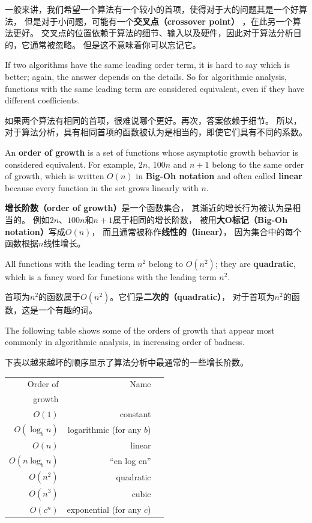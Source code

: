 \documentclass[10pt]{book}
\begin{document}
\begin{CJK}{UTF8}{gbsn}
一般来讲，我们希望一个算法有一个较小的首项，使得对于大的问题其是一个好算法，
但是对于小问题，可能有一个{\bf 交叉点（crossover point）} ，在此另一个算法更好。
交叉点的位置依赖于算法的细节、输入以及硬件，因此对于算法分析目的，它通常被忽略。
但是这不意味着你可以忘记它。

If two algorithms have the same leading order term, it is hard to say
which is better; again, the answer depends on the details.  So for
algorithmic analysis, functions with the same leading term
are considered equivalent, even if they have different coefficients.

如果两个算法有相同的首项，很难说哪个更好。再次，答案依赖于细节。
所以，对于算法分析，具有相同首项的函数被认为是相当的，即使它们具有不同的系数。

An {\bf order of growth} is a set of functions whose asymptotic growth
behavior is considered equivalent.  For example, $2n$, $100n$ and $n+1$ 
belong to the same order of growth, which is written $O(n)$ in
{\bf Big-Oh notation} and often called {\bf linear} because every function
in the set grows linearly with $n$.

{\bf 增长阶数（order of growth）}是一个函数集合，
其渐近的增长行为被认为是相当的。
例如$2n$、$100n$和$n+1$属于相同的增长阶数，
被用{\bf 大O标记（Big-Oh notation）}写成$O(n)$，
而且通常被称作{\bf 线性的（linear）}，
因为集合中的每个函数根据$n$线性增长。

All functions with the leading term $n^2$ belong to $O(n^2)$; they are
{\bf quadratic}, which is a fancy word for functions with the
leading term $n^2$.

首项为$n^2$的函数属于$O(n^2)$。它们是{\bf 二次的（quadratic）}，
对于首项为$n^2$的函数，这是一个有趣的词。

The following table shows some of the orders of growth that
appear most commonly in algorithmic analysis,
in increasing order of badness.

下表以越来越坏的顺序显示了算法分析中最通常的一些增长阶数。

\begin{tabular}{|r|r|r|}
\hline
Order of     &   Name      \\
growth       &               \\
\hline
$O(1)$             & constant \\
$O(\log_b n)$      & logarithmic (for any $b$) \\
$O(n)$             & linear \\
$O(n \log_b n)$    & ``en log en'' \\
$O(n^2)$           & quadratic     \\
$O(n^3)$           & cubic     \\
$O(c^n)$           & exponential (for any $c$)    \\
\hline
\end{tabular}


\end{CJK}
\end{document}
